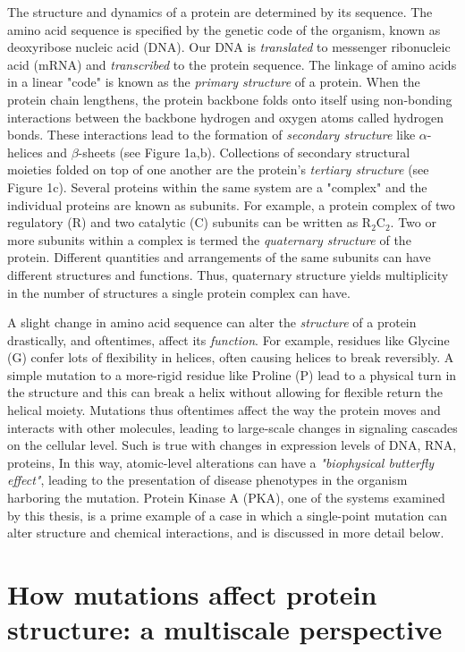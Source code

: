 \documentclass[12pt]{ucsddissertation}
\begin{document}
\begin{dissertationintroduction}
The structure and dynamics of a protein are determined by its sequence. The amino acid sequence is specified by the genetic code of the organism, known as deoxyribose nucleic acid (DNA). Our DNA is \textit{translated} to messenger ribonucleic acid (mRNA) and \textit{transcribed} to the protein sequence. The linkage of amino acids in a linear "code" is known as the \textit{primary structure} of a protein. When the protein chain lengthens, the protein backbone folds onto itself using non-bonding interactions between the backbone hydrogen and oxygen atoms called hydrogen bonds. These interactions lead to the formation of \textit{secondary structure} like $\alpha$-helices and $\beta$-sheets (see Figure 1a,b). Collections of secondary structural moieties folded on top of one another are the protein's \textit{tertiary structure} (see Figure 1c). Several proteins within the same system are a "complex" and the individual proteins are known as subunits. For example, a protein complex of two regulatory (R) and two catalytic (C) subunits can be written as R$_{2}$C$_{2}$. Two or more subunits within a complex is termed the \textit{quaternary structure} of the protein. Different quantities and arrangements of the same subunits can have different structures and functions. Thus, quaternary structure yields multiplicity in the number of structures a single protein complex can have. 

A slight change in amino acid sequence can alter the \textit{structure} of a protein drastically, and oftentimes, affect its \textit{function}. For example, residues like Glycine (G) confer lots of flexibility in helices, often causing helices to break reversibly. A simple mutation to a more-rigid residue like Proline (P) lead to a physical turn in the structure and this can break a helix without allowing for flexible return the helical moiety. Mutations thus oftentimes affect the way the protein moves and interacts with other molecules, leading to large-scale changes in signaling cascades on the cellular level. Such is true with changes in expression levels of DNA, RNA, proteins, In this way, atomic-level alterations can have a \textit{"biophysical butterfly effect"}, leading to the presentation of disease phenotypes in the organism harboring the mutation. Protein Kinase A (PKA), one of the systems examined by this thesis, is a prime example of a case in which a single-point mutation can alter structure and chemical interactions, and is discussed in more detail below.

\section{How mutations affect protein structure: a multiscale perspective}


\end{dissertationintroduction}
\end{document}
